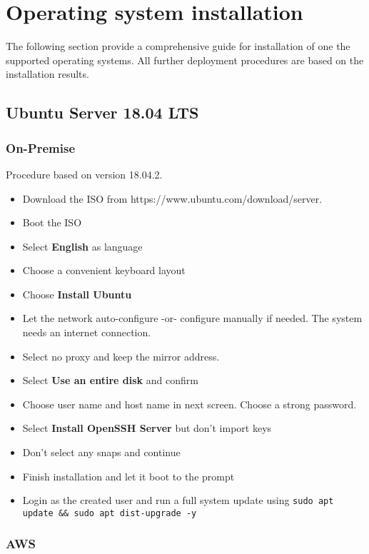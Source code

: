\section{Operating system installation}

The following section provide a comprehensive guide for installation of one the supported operating systems.
All further deployment procedures are based on the installation results.

\subsection{Ubuntu Server 18.04 LTS}

\subsubsection{On-Premise}

Procedure based on version 18.04.2.

\begin{itemize}
    \item Download the ISO from https://www.ubuntu.com/download/server.
    \item Boot the ISO
    \item Select \textbf{English} as language
    \item Choose a convenient keyboard layout
    \item Choose \textbf{Install Ubuntu}
    \item Let the network auto-configure -or- configure manually if needed. The system needs an internet connection.
    \item Select no proxy and keep the mirror address.
    \item Select \textbf{Use an entire disk} and confirm
    \item Choose user name and host name in next screen. Choose a strong password.
    \item Select \textbf{Install OpenSSH Server} but don't import keys   
    \item Don't select any snaps and continue
    \item Finish installation and let it boot to the prompt
    \item Login as the created user and run a full system update using \texttt{sudo apt update \&\& sudo apt dist-upgrade -y}
\end{itemize}

\subsubsection{AWS}

